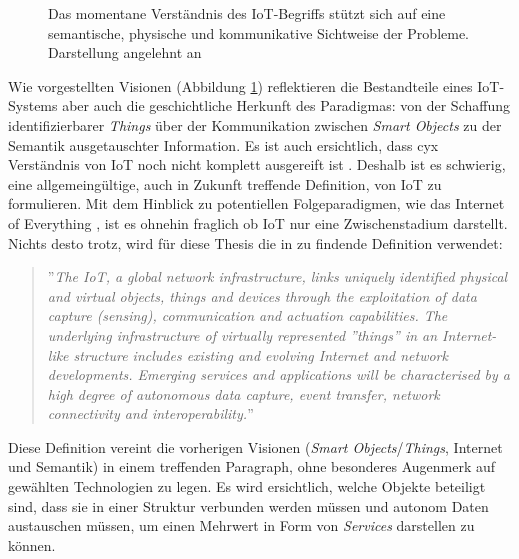 \begin{figure}
    \centering
    \caption{Das momentane Verständnis des \ac{IoT}-Begriffs stützt sich auf eine semantische, physische und kommunikative Sichtweise der Probleme. Darstellung angelehnt an \cite{atzori2010internet}}
    \label{fig:visions}
\end{figure}


Wie vorgestellten Visionen (Abbildung \ref{fig:visions}) reflektieren die Bestandteile eines \ac{IoT}-Systems aber auch die geschichtliche Herkunft des Paradigmas: von der Schaffung identifizierbarer \textit{Things} über der Kommunikation zwischen \textit{Smart Objects} zu der Semantik ausgetauschter Information. Es ist auch ersichtlich, dass cyx Verständnis von \ac{IoT} noch nicht komplett ausgereift ist \cite{atzori2010internet}. Deshalb ist es schwierig, eine allgemeingültige, auch in Zukunft treffende Definition, von \ac{IoT} zu formulieren. Mit dem Hinblick zu potentiellen Folgeparadigmen, wie das Internet of Everything \cite{Snyder2017}, ist es ohnehin fraglich ob \ac{IoT} nur eine Zwischenstadium darstellt. Nichts desto trotz, wird für diese Thesis die in \cite{Misra2017} zu findende Definition verwendet: 
\begin{quote}
   ''\textit{The \ac{IoT}, a global network infrastructure, links uniquely identified physical and virtual objects, things and devices through the exploitation of data capture (sensing), communication and actuation capabilities. The underlying infrastructure of virtually represented ''things'' in an Internet-like structure includes existing and evolving Internet and network developments. Emerging services and applications will be characterised by a high degree of autonomous data capture, event transfer, network connectivity and interoperability.}''
\end{quote}

Diese Definition vereint die vorherigen Visionen (\textit{Smart Objects}/\textit{Things}, Internet und Semantik) in einem treffenden Paragraph, ohne besonderes Augenmerk auf gewählten Technologien zu legen. Es wird ersichtlich, welche Objekte beteiligt sind, dass sie in einer Struktur verbunden werden müssen und autonom Daten austauschen müssen, um einen Mehrwert in Form von \textit{Services} darstellen zu können. 


